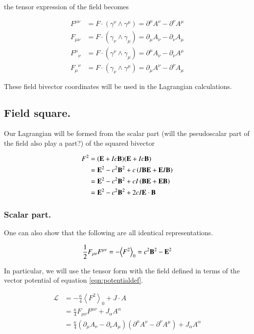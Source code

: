 \documentclass{article}
\newcommand{\LL}[0]{\mathcal{L}}
\newcommand{\gpgrade}[2] {{\left\langle{{#1}}\right\rangle}_{#2}}
\newcommand{\gpgradezero}[1] {\gpgrade{#1}{0}}
\begin{document}
the tensor expression of the field becomes

\begin{align*}\label{eqn:tensorpot}
F^{\mu\nu} &= F \cdot (\gamma^{\nu} \wedge \gamma^{\mu}) = \partial^{\mu} A^{\nu} - \partial^{\nu} A^{\mu} \\
F_{\mu\nu} &= F \cdot (\gamma_{\nu} \wedge \gamma_{\mu}) = \partial_{\mu} A_{\nu} - \partial_{\nu} A_{\mu} \\
{F^{\mu}}_{\nu} &= F \cdot (\gamma^{\nu} \wedge \gamma_{\mu}) = \partial^{\mu} A_{\nu} - \partial_{\nu} A^{\mu} \\
{F_{\mu}}^{\nu} &= F \cdot (\gamma_{\nu} \wedge \gamma^{\mu}) = \partial_{\mu} A^{\nu} - \partial^{\nu} A_{\mu}
\end{align*}

These field bivector coordinates will be used in the Lagrangian calculations.

\subsection{ Field square. }

Our Lagrangian will be formed from the scalar part (will the pseudoscalar part of the field also play a part?) of the squared bivector

\begin{align*}
F^2 
&= (\mathbf{E} + I c \mathbf{B}) (\mathbf{E} + I c \mathbf{B}) \\
&= \mathbf{E}^2 - c^2 \mathbf{B}^2 + c \left( I \mathbf{B} \mathbf{E} + \mathbf{E} I \mathbf{B} \right) \\
&= \mathbf{E}^2 - c^2 \mathbf{B}^2 + c I \left( \mathbf{B} \mathbf{E} + \mathbf{E} \mathbf{B} \right) \\
&= \mathbf{E}^2 - c^2 \mathbf{B}^2 + 2 c I \mathbf{E} \cdot \mathbf{B}
\end{align*}

\subsubsection{ Scalar part. }

One can also show that the following are all identical representations.

\begin{equation}
\inv{2} F_{\mu\nu}F^{\mu\nu} = -\gpgradezero{F^2} = c^2 \BB^2 -\BE^2
\end{equation}

In particular, we will use the tensor form with the field defined in terms of the vector potential of equation \ref{eqn:potentialdef}.

\begin{align}
\LL &= -\frac{\kappa}{4} \gpgradezero{F^2} + J \cdot A \\
&= \frac{\kappa}{4} F_{\mu\nu} F^{\mu\nu} + J_{\alpha} A^{\alpha} \\
&= \frac{\kappa}{4} ( \partial_{\mu} A_{\nu} - \partial_{\nu} A_{\mu} ) ( \partial^{\mu} A^{\nu} - \partial^{\nu} A^{\mu} ) + J_{\alpha} A^{\alpha}
\end{align}
\end{document}
